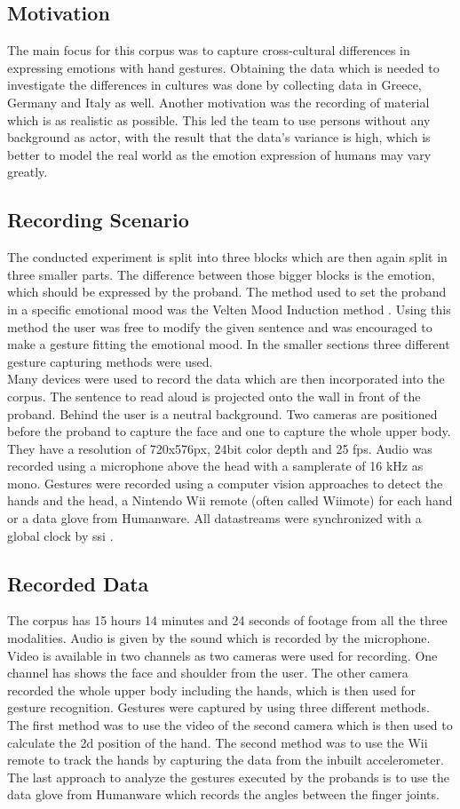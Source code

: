 \documentclass[a4paper]{article}
\begin{document}
		\subsection{Motivation}
			The main focus for this corpus was to capture cross-cultural differences in expressing emotions with hand gestures. Obtaining the data which is needed to investigate the differences in cultures was done by collecting data in Greece, Germany and Italy as well. Another motivation was the recording of material which is as realistic as possible. This led the team to use persons without any background as actor, with the result that the data's variance is high, which is better to model the real world as the emotion expression of humans may vary greatly.
		\subsection{Recording Scenario}
			The conducted experiment is split into three blocks which are then again split in three smaller parts. The difference between those bigger blocks is the emotion, which should be expressed by the proband. The method used to set the proband in a specific emotional mood was the Velten Mood Induction method \cite{VeltenJr1968473}. Using this method the user was free to modify the given sentence and was encouraged to make a gesture fitting the emotional mood. In the smaller sections three different gesture capturing methods were used.\\
			Many devices were used to record the data which are then incorporated into the corpus. The sentence to read aloud is projected onto the wall in front of the proband. Behind the user is a neutral background. Two cameras are positioned before the proband to capture the face and one to capture the whole upper body. They have a resolution of 720x576px, 24bit color depth and 25 fps. Audio was recorded using a microphone above the head with a samplerate of 16 kHz as mono. Gestures were recorded using a computer vision approaches to detect the hands and the head, a Nintendo Wii remote (often called Wiimote) for each hand or a data glove from Humanware. All datastreams were synchronized with a global clock by \gls{ssi} \cite{SmartSensorIntegration2010}.
		\subsection{Recorded Data}
			The corpus has 15 hours 14 minutes and 24 seconds of footage from all the three modalities. Audio is given by the sound which is recorded by the microphone. Video is available in two channels as two cameras were used for recording. One channel has shows the face and shoulder from the user. The other camera recorded the whole upper body including the hands, which is then used for gesture recognition. Gestures were captured by using three different methods. The first method was to use the video of the second camera which is then used to calculate the 2d position of the hand. The second method was to use the Wii remote to track the hands by capturing the data from the inbuilt accelerometer. The last approach to analyze the gestures executed by the probands is to use the data glove from Humanware which records the angles between the finger joints.
\end{document}
